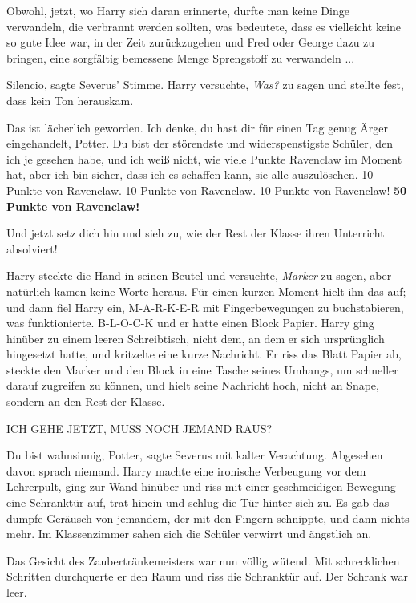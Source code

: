 Obwohl, jetzt, wo Harry sich daran erinnerte, durfte man keine Dinge verwandeln,
die verbrannt werden sollten, was bedeutete, dass es vielleicht keine so gute
Idee war, in der Zeit zurückzugehen und Fred oder George dazu zu bringen, eine
sorgfältig bemessene Menge Sprengstoff zu verwandeln ...

\glqq{}Silencio\grqq{}, sagte Severus' Stimme. Harry versuchte, \glqq{}
\emph{Was?\grqq{}} zu sagen und stellte fest, dass kein Ton herauskam.

\glqq{}Das ist lächerlich geworden. Ich denke, du hast dir für einen Tag genug
Ärger eingehandelt, Potter. Du bist der störendste und widerspenstigste Schüler,
den ich je gesehen habe, und ich weiß nicht, wie viele Punkte Ravenclaw im
Moment hat, aber ich bin sicher, dass ich es schaffen kann, sie alle
auszulöschen. 10 Punkte von Ravenclaw. 10 Punkte von Ravenclaw. 10 Punkte von
Ravenclaw! \textbf{50 Punkte von Ravenclaw!}

Und jetzt setz dich hin und sieh zu, wie der Rest der Klasse ihren Unterricht
absolviert!\grqq{}

Harry steckte die Hand in seinen Beutel und versuchte, \glqq{}
\emph{Marker}\grqq{} zu sagen, aber natürlich kamen keine Worte heraus. Für
einen kurzen Moment hielt ihn das auf; und dann fiel Harry ein, M-A-R-K-E-R mit
Fingerbewegungen zu buchstabieren, was funktionierte. B-L-O-C-K und er hatte
einen Block Papier. Harry ging hinüber zu einem leeren Schreibtisch, nicht dem,
an dem er sich ursprünglich hingesetzt hatte, und kritzelte eine kurze
Nachricht. Er riss das Blatt Papier ab, steckte den Marker und den Block in eine
Tasche seines Umhangs, um schneller darauf zugreifen zu können, und hielt seine
Nachricht hoch, nicht an Snape, sondern an den Rest der Klasse.

ICH GEHE JETZT, MUSS NOCH JEMAND RAUS?

\glqq{}Du bist wahnsinnig, Potter\grqq{}, sagte Severus mit kalter Verachtung.
Abgesehen davon sprach niemand. Harry machte eine ironische Verbeugung vor dem
Lehrerpult, ging zur Wand hinüber und riss mit einer geschmeidigen Bewegung eine
Schranktür auf, trat hinein und schlug die Tür hinter sich zu. Es gab das dumpfe
Geräusch von jemandem, der mit den Fingern schnippte, und dann nichts mehr. Im
Klassenzimmer sahen sich die Schüler verwirrt und ängstlich an.

Das Gesicht des Zaubertränkemeisters war nun völlig wütend. Mit schrecklichen
Schritten durchquerte er den Raum und riss die Schranktür auf. Der Schrank war
leer.

